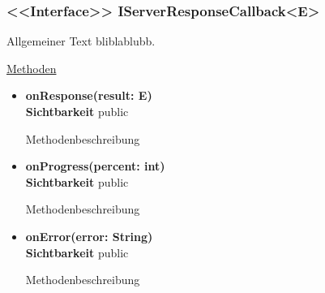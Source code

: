 \subsubsection{<<Interface>> IServerResponseCallback<E>}
Allgemeiner Text bliblablubb. \newline

\underline{Methoden}
\begin{itemize}
\itemsep0pt
\item \textbf{onResponse(result: E)}\hfill\\
\textbf{Sichtbarkeit} public

Methodenbeschreibung

\item \textbf{onProgress(percent: int)}\hfill\\
\textbf{Sichtbarkeit} public

Methodenbeschreibung

\item \textbf{onError(error: String)}\hfill\\
\textbf{Sichtbarkeit} public

Methodenbeschreibung

\end{itemize}